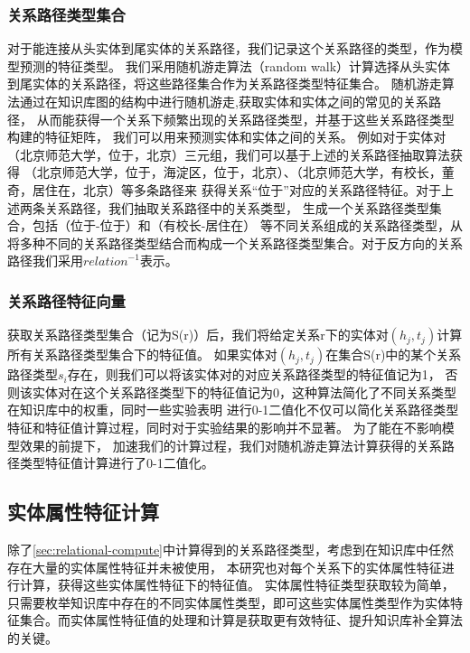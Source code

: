 \subsubsection{关系路径类型集合}
\label{sec:relational-set}

对于能连接从头实体到尾实体的关系路径，我们记录这个关系路径的类型，作为模型预测的特征类型。
我们采用随机游走算法（random walk）\cite{Lovsz1993RandomWO}计算选择从头实体到尾实体的关系路径，将这些路径集合作为关系路径类型特征集合。
随机游走算法通过在知识库图的结构中进行随机游走,获取实体和实体之间的常见的关系路径，
从而能获得一个关系下频繁出现的关系路径类型，并基于这些关系路径类型构建的特征矩阵，
我们可以用来预测实体和实体之间的关系。
例如对于实体对（北京师范大学，位于，北京）三元组，我们可以基于上述的关系路径抽取算法获得
（北京师范大学，位于，海淀区，位于，北京）、（北京师范大学，有校长，董奇，居住在，北京）等多条路径来
获得关系“位于”对应的关系路径特征。对于上述两条关系路径，我们抽取关系路径中的关系类型，
生成一个关系路径类型集合，包括（位于-位于）和（有校长-居住在）
等不同关系组成的关系路径类型，从将多种不同的关系路径类型结合而构成一个关系路径类型集合。对于反方向的关系路径我们采用${relation}^{-1}$表示。

\subsubsection{关系路径特征向量}
获取关系路径类型集合（记为S(r)）后，我们将给定关系r下的实体对$(h_j,t_j)$计算所有关系路径类型集合下的特征值。
如果实体对$(h_j,t_j)$在集合S(r)中的某个关系路径类型$s_i$存在，则我们可以将该实体对的对应关系路径类型的特征值记为1，
否则该实体对在这个关系路径类型下的特征值记为0，这种算法简化了不同关系类型在知识库中的权重，同时一些实验表明\cite{Gardner2014}
进行0-1二值化不仅可以简化关系路径类型特征和特征值计算过程，同时对于实验结果的影响并不显著。
为了能在不影响模型效果的前提下，
加速我们的计算过程，我们对随机游走算法计算获得的关系路径类型特征值计算进行了0-1二值化。

\subsection{实体属性特征计算}
\label{sec:literal-compute}
除了\ref{sec:relational-compute}中计算得到的关系路径类型，考虑到在知识库中任然存在大量的实体属性特征并未被使用，
本研究也对每个关系下的实体属性特征进行计算，获得这些实体属性特征下的特征值。
实体属性特征类型获取较为简单，只需要枚举知识库中存在的不同实体属性类型，即可这些实体属性类型作为实体特征集合。而实体属性特征值的处理和计算是获取更有效特征、提升知识库补全算法的关键。

